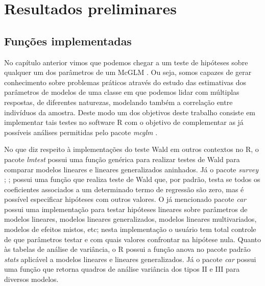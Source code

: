 
\chapter{Resultados preliminares}

\label{cap:result}

\section{Funções implementadas}

No capítulo anterior vimos que podemos chegar a um teste de hipóteses sobre qualquer um dos parâmetros de um McGLM \citep{Bonat16}. Ou seja, somos capazes de gerar conhecimento sobre problemas práticos através do estudo das estimativas dos parâmetros de modelos de uma classe em que podemos lidar com múltiplas respostas, de diferentes naturezas, modelando também a correlação entre indivíduos da amostra. Deste modo um dos objetivos deste trabalho consiste em implementar tais testes no software R \citep{softwareR} com o objetivo de complementar as já possíveis análises permitidas pelo pacote \emph{mcglm} \citep{mcglm}.

No que diz respeito à implementações do teste Wald em outros contextos no R, o pacote \emph{lmtest} \citep{lmtest} possui uma função genérica para realizar testes de Wald para comparar modelos lineares e lineares generalizados aninhados. Já o pacote \emph{survey} \citep{survey1}; \citep{survey2};\citep{survey3} possui uma função que realiza teste de Wald que, por padrão, testa se todos os coeficientes associados a um determinado termo de regressão são zero, mas é possível especificar hipóteses com outros valores. O já mencionado pacote \emph{car} \citep{car} possui uma implementação para testar hipóteses lineares sobre parâmetros de modelos lineares, modelos lineares generalizados, modelos lineares multivariados, modelos de efeitos mistos, etc; nesta implementação o usuário tem total controle de que parâmetros testar e com quais valores confrontar na hipótese nula. Quanto às tabelas de análise de variância, o R possui a função anova no pacote padrão \emph{stats} \citep{softwareR} aplicável a modelos lineares e lineares generalizados. Já o pacote \emph{car} \citep{car} possui uma função que retorna quadros de análise variância dos tipos II e III para diversos modelos. 

